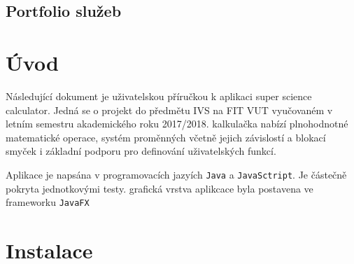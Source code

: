 \documentclass[11pt, a4paper, titlepage]{article}
\begin{document}
	
	\pagestyle{fancy}

	\begin{center}
		\section*{Portfolio služeb}
	\end{center}

	\tableofcontents

	\section{Úvod}
	Následující dokument je uživatelskou příručkou k aplikaci super science calculator. Jedná se o projekt do
	předmětu IVS na FIT VUT vyučovaném v letním semestru akademického roku 2017/2018. kalkulačka nabízí 
	plnohodnotné matematické operace, systém proměnných včetně jejich závislostí a blokací smyček i základní podporu
	pro definování uživatelských funkcí.

	Aplikace je napsána v programovacích jazyích \texttt{Java} a \texttt{JavaSctript}. Je částečně pokryta jednotkovými testy.
	grafická vrstva aplikcace byla postavena ve frameworku \texttt{JavaFX}

	\section{Instalace}
\end{document}
